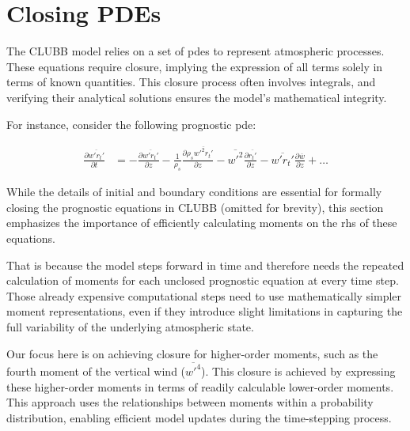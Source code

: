 \section{Closing PDEs}\label{sec:closing_pdes}

The \gls{CLUBB} model relies on a set of \glspl{pde} to represent atmospheric processes.
These equations require closure,
implying the expression of all terms solely in terms of known quantities.
This closure process often involves integrals,
and verifying their analytical solutions ensures the model's mathematical integrity.

For instance, consider the following prognostic \gls{pde}\autocite[p. 21]{larson2022clubbsilhs}:

\begin{align*}
    \frac{\partial \overline{w'r_t'}}{\partial t}
    &= -\frac{\partial \overline{w'r_t'}}{\partial z}
    - \frac{1}{\rho_s} \frac{\partial \rho_s \overline{w'^2 r_t'}}{\partial z}
    - \overline{w'^2} \frac{\partial \overline{r_t'}}{\partial z}
    - \overline{w'r_t'} \frac{\partial \overline{w}}{\partial z}
    + \ldots
\end{align*}

While the details of initial and boundary conditions are essential
for formally closing the prognostic equations in \gls{CLUBB} (omitted for brevity),
this section emphasizes the importance of efficiently calculating moments
on the \gls{rhs} of these equations.

That is because the model steps forward in time and therefore needs the repeated calculation of moments
for each unclosed prognostic equation at every time step.
Those already expensive computational steps need to use mathematically simpler moment representations,
even if they introduce slight limitations in capturing the full variability of the underlying atmospheric state.

Our focus here is on achieving closure for higher-order moments,
such as the fourth moment of the vertical wind ($\overline{w'^4}$).
This closure is achieved by expressing these higher-order moments in terms of readily calculable lower-order moments.
This approach uses the relationships between moments within a probability distribution,
enabling efficient model updates during the time-stepping process.